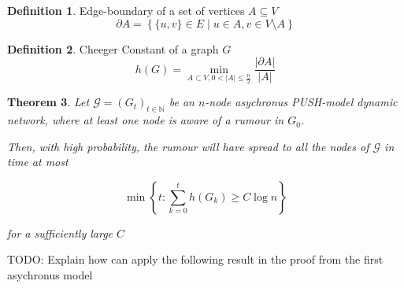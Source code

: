 \documentclass[a4paper,11pt]{article}
\newtheorem{theorem}{Theorem}[section]
\theoremstyle{definition}
\newtheorem{definition}[theorem]{Definition}
\begin{document}
\begin{definition}
	Edge-boundary of a set of vertices $A \subseteq V$
	$$
		\partial A = \left\{ \{u, v\} \in E \mid u \in A, v \in V \setminus A \right\} 
	$$
\end{definition}

\begin{definition}
	Cheeger Constant of a graph $G$
	$$
		h(G) = \min_{A \subset V, 0 < |A| \leq \frac{n}{2}} \frac{|\partial A|}{|A|}
	$$

\end{definition}

\begin{theorem}
	Let $\mathcal{G} = (G_t)_{t \in \mathbb{N}}$ be an $n$-node asychronus PUSH-model dynamic network, where at least one node is aware of a rumour in $G_0$.

	Then, with high probability, the rumour will have spread to all the nodes of $\mathcal{G}$ in time at most

	$$
		\min \left\{t : \sum_{k=0}^t h(G_k) \geq C \log n \right\} 
	$$

	\noindent
	for a sufficiently large $C$
\end{theorem}

TODO: Explain how can apply the following result in the proof from the first asychronus model
\end{document}
